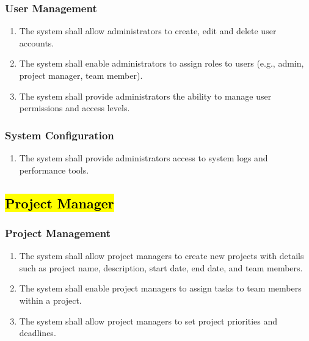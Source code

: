 \documentclass[]{article}
\begin{document}
            \subsubsection{User Management}
            \begin{enumerate}[label=\scriptsize\textbf{\textcolor{gray}{FR-ADM-\arabic{adminCounter}}}, leftmargin=*, itemsep=-4px]
                \item The system shall allow administrators to create, edit and delete user accounts.
                \item The system shall enable administrators to assign roles to users (e.g., admin, project manager, team member).
                \item The system shall provide administrators the ability to manage user permissions and access levels.
            \end{enumerate}

            \subsubsection{System Configuration}
            \begin{enumerate}[label=\scriptsize\textbf{\textcolor{gray}{FR-ADM-\arabic{adminCounter}}}, leftmargin=*, itemsep=-4px]
                \item The system shall provide administrators access to system logs and performance tools.
            \end{enumerate}

        \subsection{\hl{Project Manager}}
            \subsubsection{Project Management}
            \begin{enumerate}[label=\scriptsize\textbf{\textcolor{gray}{FR-PM-\arabic{pmCounter}}}, leftmargin=*, itemsep=-4px]
               \item The system shall allow project managers to create new projects with details such as project name, description, start date, end date, and team members.
               \item The system shall enable project managers to assign tasks to team members within a project.
               \item The system shall allow project managers to set project priorities and deadlines.
            \end{enumerate}
\end{document}
